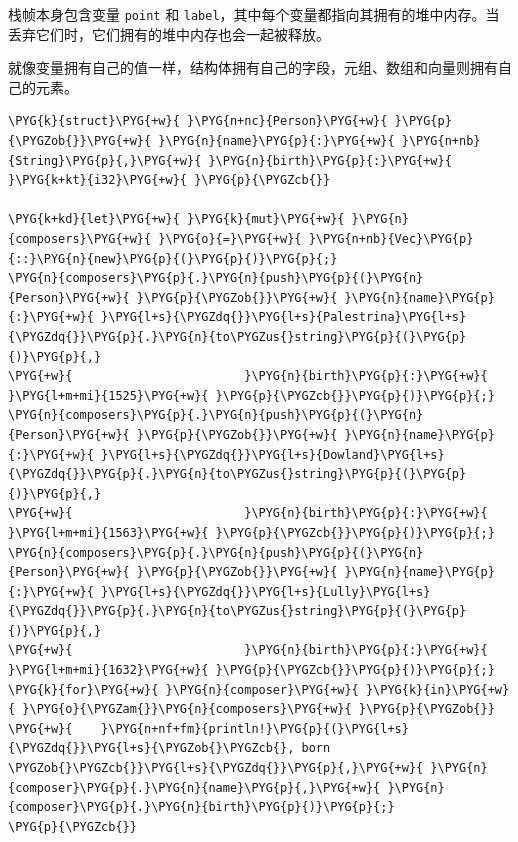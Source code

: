 
栈帧本身包含变量 \texttt{point} 和 \texttt{label}，其中每个变量都指向其拥有的堆中内存。当丢弃它们时，它们拥有的堆中内存也会一起被释放。

就像变量拥有自己的值一样，结构体拥有自己的字段，元组、数组和向量则拥有自己的元素。

\begin{Verbatim}[commandchars=\\\{\},breaklines=true,breakanywhere=true,fontsize=\codefont,xleftmargin=17bp]
\PYG{k}{struct}\PYG{+w}{ }\PYG{n+nc}{Person}\PYG{+w}{ }\PYG{p}{\PYGZob{}}\PYG{+w}{ }\PYG{n}{name}\PYG{p}{:}\PYG{+w}{ }\PYG{n+nb}{String}\PYG{p}{,}\PYG{+w}{ }\PYG{n}{birth}\PYG{p}{:}\PYG{+w}{ }\PYG{k+kt}{i32}\PYG{+w}{ }\PYG{p}{\PYGZcb{}}

\PYG{k+kd}{let}\PYG{+w}{ }\PYG{k}{mut}\PYG{+w}{ }\PYG{n}{composers}\PYG{+w}{ }\PYG{o}{=}\PYG{+w}{ }\PYG{n+nb}{Vec}\PYG{p}{::}\PYG{n}{new}\PYG{p}{(}\PYG{p}{)}\PYG{p}{;}
\PYG{n}{composers}\PYG{p}{.}\PYG{n}{push}\PYG{p}{(}\PYG{n}{Person}\PYG{+w}{ }\PYG{p}{\PYGZob{}}\PYG{+w}{ }\PYG{n}{name}\PYG{p}{:}\PYG{+w}{ }\PYG{l+s}{\PYGZdq{}}\PYG{l+s}{Palestrina}\PYG{l+s}{\PYGZdq{}}\PYG{p}{.}\PYG{n}{to\PYGZus{}string}\PYG{p}{(}\PYG{p}{)}\PYG{p}{,}
\PYG{+w}{                        }\PYG{n}{birth}\PYG{p}{:}\PYG{+w}{ }\PYG{l+m+mi}{1525}\PYG{+w}{ }\PYG{p}{\PYGZcb{}}\PYG{p}{)}\PYG{p}{;}
\PYG{n}{composers}\PYG{p}{.}\PYG{n}{push}\PYG{p}{(}\PYG{n}{Person}\PYG{+w}{ }\PYG{p}{\PYGZob{}}\PYG{+w}{ }\PYG{n}{name}\PYG{p}{:}\PYG{+w}{ }\PYG{l+s}{\PYGZdq{}}\PYG{l+s}{Dowland}\PYG{l+s}{\PYGZdq{}}\PYG{p}{.}\PYG{n}{to\PYGZus{}string}\PYG{p}{(}\PYG{p}{)}\PYG{p}{,}
\PYG{+w}{                        }\PYG{n}{birth}\PYG{p}{:}\PYG{+w}{ }\PYG{l+m+mi}{1563}\PYG{+w}{ }\PYG{p}{\PYGZcb{}}\PYG{p}{)}\PYG{p}{;}
\PYG{n}{composers}\PYG{p}{.}\PYG{n}{push}\PYG{p}{(}\PYG{n}{Person}\PYG{+w}{ }\PYG{p}{\PYGZob{}}\PYG{+w}{ }\PYG{n}{name}\PYG{p}{:}\PYG{+w}{ }\PYG{l+s}{\PYGZdq{}}\PYG{l+s}{Lully}\PYG{l+s}{\PYGZdq{}}\PYG{p}{.}\PYG{n}{to\PYGZus{}string}\PYG{p}{(}\PYG{p}{)}\PYG{p}{,}
\PYG{+w}{                        }\PYG{n}{birth}\PYG{p}{:}\PYG{+w}{ }\PYG{l+m+mi}{1632}\PYG{+w}{ }\PYG{p}{\PYGZcb{}}\PYG{p}{)}\PYG{p}{;}
\PYG{k}{for}\PYG{+w}{ }\PYG{n}{composer}\PYG{+w}{ }\PYG{k}{in}\PYG{+w}{ }\PYG{o}{\PYGZam{}}\PYG{n}{composers}\PYG{+w}{ }\PYG{p}{\PYGZob{}}
\PYG{+w}{    }\PYG{n+nf+fm}{println!}\PYG{p}{(}\PYG{l+s}{\PYGZdq{}}\PYG{l+s}{\PYGZob{}\PYGZcb{}, born \PYGZob{}\PYGZcb{}}\PYG{l+s}{\PYGZdq{}}\PYG{p}{,}\PYG{+w}{ }\PYG{n}{composer}\PYG{p}{.}\PYG{n}{name}\PYG{p}{,}\PYG{+w}{ }\PYG{n}{composer}\PYG{p}{.}\PYG{n}{birth}\PYG{p}{)}\PYG{p}{;}
\PYG{p}{\PYGZcb{}}
\end{Verbatim}

